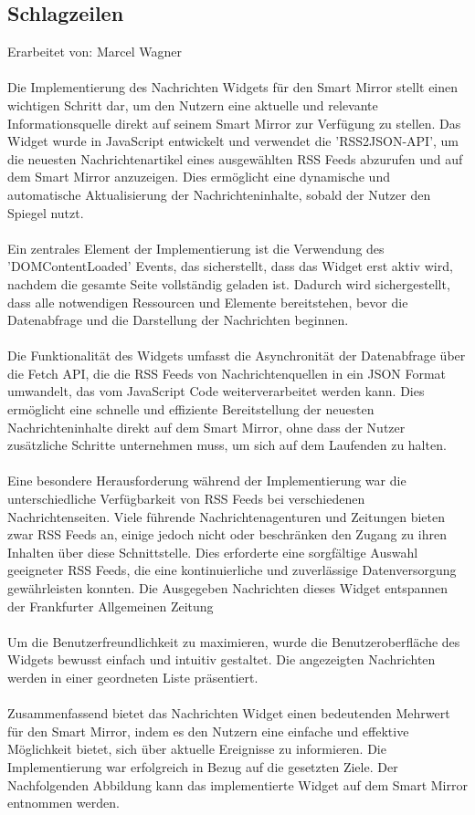 \subsection{Schlagzeilen}
Erarbeitet von: Marcel Wagner \\ \\
\noindent
Die Implementierung des Nachrichten Widgets für den Smart Mirror stellt einen wichtigen Schritt dar, um den Nutzern eine aktuelle und relevante Informationsquelle direkt auf seinem Smart Mirror zur Verfügung zu stellen. Das Widget wurde in JavaScript entwickelt und verwendet die 'RSS2JSON-API', um die neuesten Nachrichtenartikel eines ausgewählten RSS Feeds abzurufen und auf dem Smart Mirror anzuzeigen. Dies ermöglicht eine dynamische und automatische Aktualisierung der Nachrichteninhalte, sobald der Nutzer den Spiegel nutzt. \\ \\
\noindent
Ein zentrales Element der Implementierung ist die Verwendung des 'DOMContentLoaded' Events, das sicherstellt, dass das Widget erst aktiv wird, nachdem die gesamte Seite vollständig geladen ist. Dadurch wird sichergestellt, dass alle notwendigen Ressourcen und Elemente bereitstehen, bevor die Datenabfrage und die Darstellung der Nachrichten beginnen. \\ \\
\noindent
Die Funktionalität des Widgets umfasst die Asynchronität der Datenabfrage über die Fetch API, die die RSS Feeds von Nachrichtenquellen in ein JSON Format umwandelt, das vom JavaScript Code weiterverarbeitet werden kann. Dies ermöglicht eine schnelle und effiziente Bereitstellung der neuesten Nachrichteninhalte direkt auf dem Smart Mirror, ohne dass der Nutzer zusätzliche Schritte unternehmen muss, um sich auf dem Laufenden zu halten. \\ \\
\noindent
Eine besondere Herausforderung während der Implementierung war die unterschiedliche Verfügbarkeit von RSS Feeds bei verschiedenen Nachrichtenseiten. Viele führende Nachrichtenagenturen und Zeitungen bieten zwar RSS Feeds an, einige jedoch nicht oder beschränken den Zugang zu ihren Inhalten über diese Schnittstelle. Dies erforderte eine sorgfältige Auswahl geeigneter RSS Feeds, die eine kontinuierliche und zuverlässige Datenversorgung gewährleisten konnten. Die Ausgegeben Nachrichten dieses Widget entspannen der Frankfurter Allgemeinen Zeitung \\ \\
\noindent
Um die Benutzerfreundlichkeit zu maximieren, wurde die Benutzeroberfläche des Widgets bewusst einfach und intuitiv gestaltet. Die angezeigten Nachrichten werden in einer geordneten Liste präsentiert. \\ \\
\noindent
Zusammenfassend bietet das Nachrichten Widget einen bedeutenden Mehrwert für den Smart Mirror, indem es den Nutzern eine einfache und effektive Möglichkeit bietet, sich über aktuelle Ereignisse zu informieren. Die Implementierung war erfolgreich in Bezug auf die gesetzten Ziele. Der Nachfolgenden Abbildung kann das implementierte Widget auf dem Smart Mirror entnommen werden.

